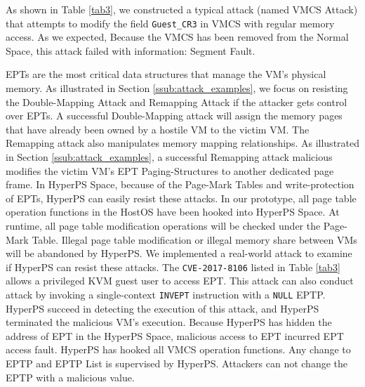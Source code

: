 As shown in Table \ref{tab3}, we constructed a typical attack (named VMCS Attack) that attempts to modify the field \verb|Guest_CR3| in VMCS with regular memory access. 
As we expected, Because the VMCS has been removed from the Normal Space, this attack failed with information: Segment Fault. 

EPTs are the most critical data structures that manage the VM's physical memory.
As illustrated in Section \ref{ssub:attack_examples}, we focus on resisting the Double-Mapping Attack and Remapping Attack if the attacker gets control over EPTs.
A successful Double-Mapping attack will assign the memory pages that have already been owned by a hostile VM to the victim VM. 
The Remapping attack also manipulates memory mapping relationships. As illustrated in Section \ref{ssub:attack_examples}, 
a successful Remapping attack malicious modifies the victim VM's EPT Paging-Structures to another dedicated page frame. 
In HyperPS Space, because of the Page-Mark Tables and write-protection of EPTs, HyperPS can easily resist these attacks. 
In our prototype, all page table operation functions in the HostOS have been hooked into HyperPS Space. At runtime, all page table modification operations will be checked under the Page-Mark Table. Illegal page table modification or illegal memory share between VMs will be abandoned by HyperPS. 
We implemented a real-world attack to examine if HyperPS can resist these attacks. 
The \verb|CVE-2017-8106| listed in Table \ref{tab3} allows a privileged KVM guest user to access EPT. 
This attack can also conduct attack by invoking a single-context \verb|INVEPT| instruction with a \verb|NULL| EPTP.
HyperPS succeed in detecting the execution of this attack, and HyperPS terminated the malicious VM's execution. 
Because HyperPS has hidden the address of EPT in the HyperPS Space, malicious access to EPT incurred EPT access fault. 
HyperPS has hooked all VMCS operation functions. Any change to EPTP and EPTP List is supervised by HyperPS. Attackers can not change the EPTP with a malicious value.


